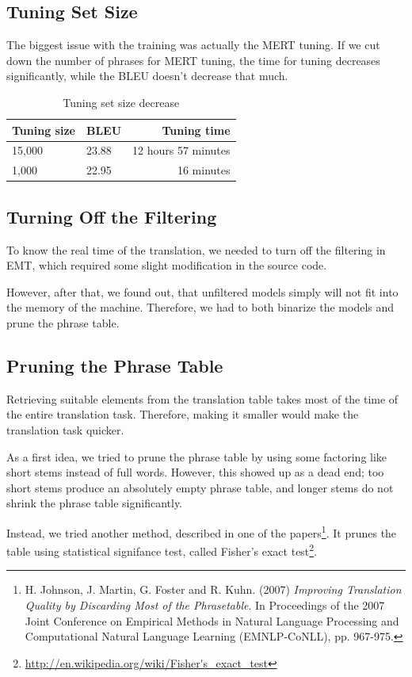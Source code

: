 \subsection{Tuning Set Size}
The biggest issue with the training was actually the MERT tuning. If we cut down the number of phrases for MERT tuning, the time for tuning decreases significantly, while the BLEU doesn't decrease that much.
\begin{table}[h]
\begin{center}
\begin{tabular}{|l|l|r|}
    \hline
    \textbf{Tuning size} & \textbf{BLEU} & \textbf{Tuning time} \\ \hline
    15,000 & 23.88 & 12 hours 57 minutes \\ \hline
    1,000 & 22.95 & 16 minutes \\  \hline
\end{tabular}
\end{center}

\caption{Tuning set size decrease}\label{moses:tuningset}
\end{table}

\subsection{Turning Off the Filtering}
To know the real time of the translation, we needed to turn off the filtering in EMT, which required some slight modification in the source code. 

However, after that, we found out, that unfiltered models simply will not fit into the memory of the machine. Therefore, we had to both binarize the models and prune the phrase table.

\subsection{Pruning the Phrase Table}
Retrieving suitable elements from the translation table takes most of the time of the entire translation task. Therefore, making it smaller would make the translation task quicker.

As a first idea, we tried to prune the phrase table by using some factoring like short stems instead of full words. However, this showed up as a dead end; too short stems produce an absolutely empty phrase table, and longer stems do not shrink the phrase table significantly.

Instead, we tried another method, described in one of the papers\footnote{H. Johnson, J. Martin, G. Foster and R. Kuhn. (2007) \emph{Improving Translation Quality by Discarding Most of the Phrasetable}. In Proceedings of the 2007 Joint Conference on Empirical Methods in Natural Language Processing and Computational Natural Language Learning (EMNLP-CoNLL), pp. 967-975.}. It prunes the table using statistical signifance test, called Fisher's exact test\footnote{\url{http://en.wikipedia.org/wiki/Fisher's_exact_test}}. 


